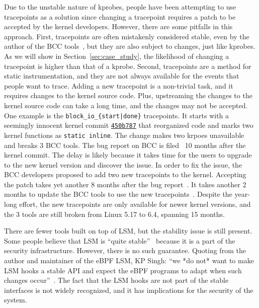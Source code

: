 Due to the unstable nature of kprobes, people have been attempting to use tracepoints as a solution since
changing a tracepoint requires a patch to be accepted by the kernel developers.
However, there are some pitfalls in this approach.
First, tracepoints are often mistakenly considered stable, even by the author of the BCC tools~\cite{tcp-tracepoint,bpf-book},
but they are also subject to changes, just like kprobes. As we will show in Section~\ref{sec:case_study}, the likelihood of changing
a tracepoint is higher than that of a kprobe.
Second, tracepoints are a method for static instrumentation, and they are not always available for the events that people want to trace.
Adding a new tracepoint is a non-trivial task, and it requires changes to the kernel source code.
Plus, upstreaming the changes to the kernel source code can take a long time, and the changes may not be accepted.
One example is the \texttt{block\_io\_\{start|done\}} tracepoints. It starts with a seemingly innocent kernel commit
\href{https://github.com/torvalds/linux/commit/450b7879e34517c3ebc3a35a53806fe40e60fac2}{\texttt{450b787}} that reorganized code and
marks two kernel functions as \texttt{static inline}. The change makes two krpoes unavailable and breaks 3 BCC tools. The bug report on BCC
is filed~\cite{bcc-bio-bug} 10 months after the kernel commit. The delay is likely because it takes time for the users to
upgrade to the new kernel version and discover the issue.
In order to fix the issue, the BCC developers proposed to add two new tracepoints
to the kernel. Accepting the patch takes yet another 8 months after the bug report~\cite{block-tracepoints}.
It takes another 2 months to update the BCC tools to use the new tracepoints~\cite{bcc-bio-fix}.
Despite the year-long effort, the new tracepoints are only available for newer kernel versions, and the 3 tools are still broken
from Linux 5.17 to 6.4, spanning 15 months.

There are fewer tools built on top of LSM, but the stability issue is still present.
Some people believe that LSM is ``quite stable''~\cite{lsm-stability} because it is a part of the security infrastructure.
However, there is no such guarantee. Quoting from the author and maintainer of the eBPF LSM, KP Singh:
``we *do not* want to make LSM hooks a stable API and expect the eBPF programs to adapt when such changes occur''~\cite{bpf-lsm-stability}.
The fact that the LSM hooks are not part of the stable interfaces is not widely recognized, and it has implications for the security of the system.





